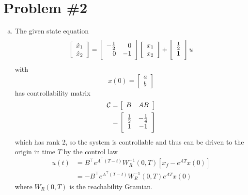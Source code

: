 \documentclass{article}
\begin{document}
\section*{Problem \#2}
\begin{enumerate}[(a)]
  \item{
  The given state equation
  $$
  \left[\begin{array}{c}
    \dot{x}_1 \\ \dot{x}_2
  \end{array}\right]
= \left[\begin{array}{r r}
    -\frac{1}{2} & 0 \\ 0 & -1
  \end{array}\right]
  \left[\begin{array}{c}
    x_1 \\ x_2
  \end{array}\right]
+ \left[\begin{array}{c}
    \frac{1}{2} \\ 1
  \end{array}\right]
  u
  $$
  with
  $$
  x(0) = \left[\begin{array}{c}
    a \\ b
  \end{array}\right]
  $$
  has controllability matrix
  \begin{align*}
    \mathcal{C} &=
    \left[\begin{array}{c c}
      B & AB
    \end{array}\right] \\
  &=
    \left[\begin{array}{c c}
      \frac{1}{2} & -\frac{1}{4} \\
      1           & -1
    \end{array}\right] \\
  \end{align*}
  which has rank 2, so the system is controllable
  and thus can be driven to the origin in time $T$
  by the control law
  \begin{align*}
    u(t) &=  B^\top e^{A^\top(T - t)} W_R^{-1}(0, T)
             [x_f - e^{AT} x(0)] \\
         &= -B^\top e^{A^\top(T - t)} W_R^{-1}(0, T) e^{AT} x(0)
  \end{align*}
  where $W_R(0, T)$ is the reachability Gramian.

}
\end{enumerate}
\end{document}

